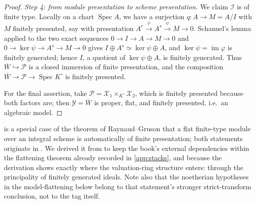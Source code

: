 \begin{proof}
\emph{Step 4: from module presentation to scheme presentation.}  We claim
$\mathcal I$ is of finite type.  Locally on a chart
$\operatorname{Spec}A$, we have a surjection $q:A\to M=A/I$ with $M$
finitely presented, say with presentation
$A^r\xrightarrow{\varphi}A^s\xrightarrow{\psi}M\to0$.  Schanuel's lemma
applied to the two exact sequences
$0\to I\to A\to M\to0$ and
$0\to\ker\psi\to A^s\to M\to0$
gives $I\oplus A^s\simeq\ker\psi\oplus A$, and $\ker\psi=\operatorname{im}\varphi$
is finitely generated; hence $I$, a quotient of
$\ker\psi\oplus A$, is finitely generated.  Thus
$\overline W\hookrightarrow\mathcal P$ is a closed immersion of finite
presentation, and the composition
$\overline W\to\mathcal P\to\operatorname{Spec}K^\circ$ is finitely
presented.

For the final assertion, take $\mathcal P=\mathcal X_1\times_{K^\circ}
\mathcal X_2$, which is finitely presented because both factors are; then
$\mathcal Y=\overline W$ is proper, flat, and finitely presented, i.e.\ an
algebraic model.
\end{proof}

\begin{remark}\label{rem:flat-closure-raynaud-gruson}
 is a special case of the
theorem of Raynaud--Gruson that a flat finite-type module over an integral
scheme is automatically of finite presentation; both statements originate
in \cite{RaynaudGruson1971}.  We derived it from
\cite[Tag 0815]{stacks-project} to keep the book's external dependencies
within the flattening theorem already recorded in \cref{app:stacks},
and because the derivation shows exactly where the valuation-ring
structure enters: through the principality of finitely generated ideals.
Note also that the noetherian hypotheses in the model-flattening
 below belong to that statement's stronger
strict-transform conclusion, not to the tag itself.
\end{remark}

